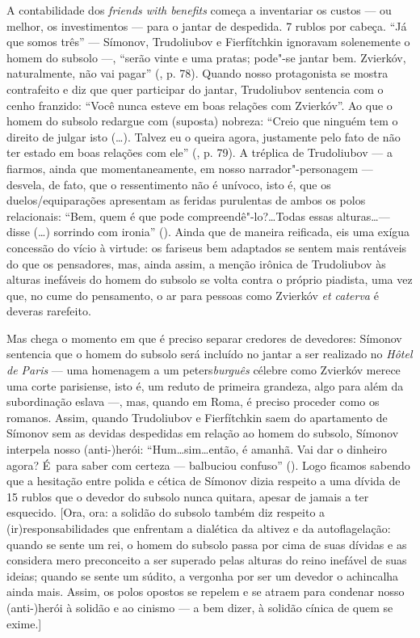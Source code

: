 A contabilidade dos \emph{friends with benefits} começa a inventariar os
custos --- ou melhor, os investimentos --- para o jantar de despedida. 7
rublos por cabeça. ``Já que somos três'' --- Símonov, Trudoliubov e
Fierfítchkin ignoravam solenemente o homem do subsolo ---, ``serão vinte
e uma pratas; pode"-se jantar bem. Zvierkóv, naturalmente, não vai
pagar'' (, p. 78). Quando nosso protagonista se mostra contrafeito e
diz que quer participar do jantar, Trudoliubov sentencia com o cenho
franzido: ``Você nunca esteve em boas relações com Zvierkóv''. Ao que o
homem do subsolo redargue com (suposta) nobreza: ``Creio que ninguém tem
o direito de julgar isto (\ldots). Talvez eu o queira agora, justamente
pelo fato de não ter estado em boas relações com ele'' (, p. 79). A
tréplica de Trudoliubov --- a fiarmos, ainda que momentaneamente, em
nosso narrador"-personagem --- desvela, de fato, que o ressentimento não é
unívoco, isto é, que os duelos/equiparações apresentam as feridas
purulentas de ambos os polos relacionais: ``Bem, quem é que pode
compreendê"-lo?\ldots Todas essas alturas\ldots --- disse (\ldots) sorrindo com
ironia'' (). Ainda que de maneira reificada, eis uma exígua
concessão do vício à virtude: os fariseus bem adaptados se sentem mais
rentáveis do que os pensadores, mas, ainda assim, a menção irônica de
Trudoliubov às alturas inefáveis do homem do subsolo se volta contra o
próprio piadista, uma vez que, no cume do pensamento, o ar para pessoas
como Zvierkóv \emph{et caterva} é deveras rarefeito.

Mas chega o momento em que é preciso separar credores de devedores:
Símonov sentencia que o homem do subsolo será incluído no jantar a ser
realizado no \emph{Hôtel de Paris} --- uma homenagem a um
peters\emph{burguês} célebre como Zvierkóv merece uma corte parisiense,
isto é, um reduto de primeira grandeza, algo para além da subordinação
eslava ---, mas, quando em Roma, é preciso proceder como os romanos.
Assim, quando Trudoliubov e Fierfítchkin saem do apartamento de Símonov
sem as devidas despedidas em relação ao homem do subsolo, Símonov
interpela nosso \mbox{(anti-)herói}: ``Hum\ldots sim\ldots então, é amanhã. Vai dar o
dinheiro agora? É~para saber com certeza --- balbuciou confuso''
(). Logo ficamos sabendo que a hesitação entre polida e cética de
Símonov dizia respeito a uma dívida de 15 rublos que o devedor do
subsolo nunca quitara, apesar de jamais a ter esquecido. {[}Ora, ora: a
solidão do subsolo também diz respeito a (ir)responsabilidades que
enfrentam a dialética da altivez e da autoflagelação: quando se sente um
rei, o homem do subsolo passa por cima de suas dívidas e as considera
mero preconceito a ser superado pelas alturas do reino inefável de suas
ideias; quando se sente um súdito, a vergonha por ser um devedor o
achincalha ainda mais. Assim, os polos opostos se repelem e se atraem
para condenar nosso \mbox{(anti-)herói} à solidão e ao cinismo --- a bem dizer,
à solidão cínica de quem se exime.{]}

